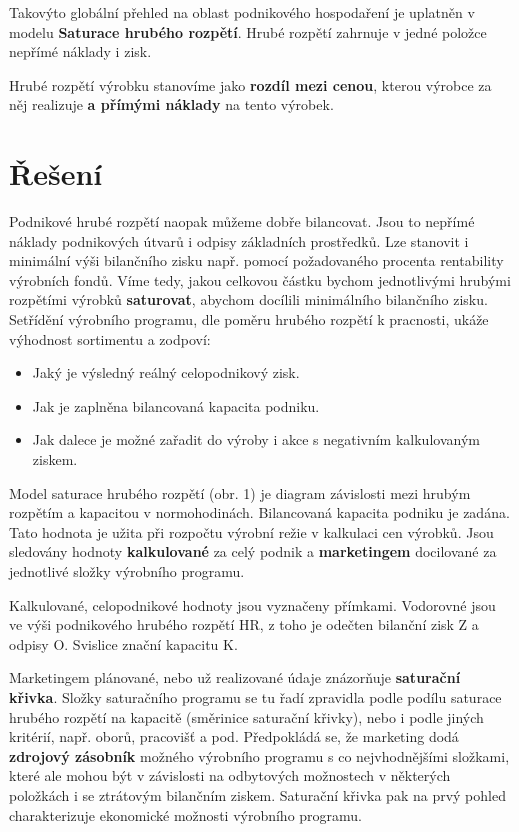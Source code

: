 \documentclass [10pt, fancyhdr, twoside] {article}
\begin{document}
Takovýto globální přehled na oblast podnikového hospodaření je uplatněn v modelu \textbf{Saturace hrubého rozpětí}. Hrubé rozpětí zahrnuje v jedné položce nepřímé náklady i zisk.

Hrubé rozpětí výrobku stanovíme jako \textbf{rozdíl mezi cenou}, kterou výrobce za něj realizuje \textbf{a přímými náklady} na tento výrobek.


\section{Řešení}

Podnikové hrubé rozpětí naopak můžeme dobře bilancovat. Jsou to nepřímé náklady podnikových útvarů i odpisy základních prostředků. Lze stanovit i minimální výši bilančního zisku např. pomocí požadovaného procenta rentability výrobních fondů. Víme tedy, jakou celkovou částku bychom jednotlivými hrubými rozpětími výrobků \textbf{saturovat}, abychom docílili minimálního bilančního zisku. Setřídění výrobního programu, dle poměru hrubého rozpětí k pracnosti, ukáže výhodnost sortimentu a zodpoví:

\begin{itemize}
\item Jaký je výsledný reálný celopodnikový zisk.
\item Jak je zaplněna bilancovaná kapacita podniku.
\item Jak dalece je možné zařadit do výroby i akce s negativním kalkulovaným ziskem.
\end{itemize}

Model saturace hrubého rozpětí (obr. 1) je diagram závislosti mezi hrubým rozpětím a kapacitou v normohodinách. Bilancovaná kapacita podniku je zadána. Tato hodnota je užita při rozpočtu výrobní režie v kalkulaci cen výrobků. Jsou sledovány hodnoty \textbf{kalkulované} za celý podnik a \textbf{marketingem} docilované za jednotlivé složky výrobního programu.

Kalkulované, celopodnikové hodnoty jsou vyznačeny přímkami. Vodorovné jsou ve výši podnikového hrubého rozpětí HR, z toho je odečten bilanční zisk Z a odpisy O. Svislice znační kapacitu K.

Marketingem plánované, nebo už realizované údaje znázorňuje \textbf{saturační křivka}. Složky saturačního programu se tu řadí zpravidla podle podílu saturace hrubého rozpětí na kapacitě (směrinice saturační křivky), nebo i podle jiných kritérií, např. oborů, pracovišť a pod. Předpokládá se, že marketing dodá \textbf{zdrojový zásobník} možného výrobního programu s co nejvhodnějšími složkami, které ale mohou být v závislosti na odbytových možnostech v některých položkách i se ztrátovým bilančním ziskem. Saturační křivka pak na prvý pohled charakterizuje ekonomické možnosti výrobního programu.
\end{document}
